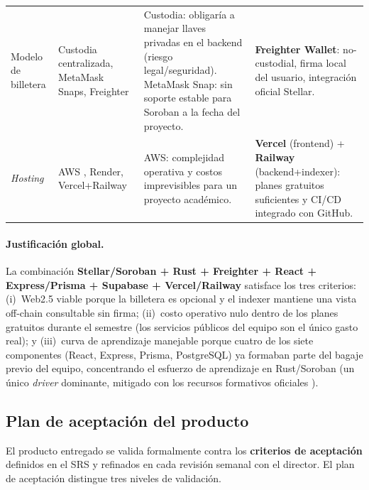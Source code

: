 \documentclass[12pt,oneside]{report}
\begin{document}
\begin{longtable}{@{}p{2.8cm} p{3.4cm} p{4.2cm} p{4.0cm}@{}}
        Modelo de billetera & Custodia centralizada, MetaMask Snaps, Freighter \cite{freighter} & Custodia: obligaría a manejar llaves privadas en el backend (riesgo legal/seguridad). MetaMask Snap: sin soporte estable para Soroban a la fecha del proyecto. & \textbf{Freighter Wallet}: no-custodial, firma local del usuario, integración oficial Stellar.\\
        \textit{Hosting} & AWS \cite{awsdocs}, Render, Vercel+Railway \cite{verceldocs,railwaydocs} & AWS: complejidad operativa y costos imprevisibles para un proyecto académico. & \textbf{Vercel} (frontend) + \textbf{Railway} (backend+indexer): planes gratuitos suficientes y CI/CD integrado con GitHub.\\
      \end{longtable}

      \paragraph{Justificación global.} La combinación \textbf{Stellar/Soroban + Rust + Freighter + React + Express/Prisma + Supabase + Vercel/Railway} satisface los tres criterios: (i)~Web2.5 viable porque la billetera es opcional y el indexer mantiene una vista off-chain consultable sin firma; (ii)~costo operativo nulo dentro de los planes gratuitos durante el semestre (los servicios públicos del equipo son el único gasto real); y (iii)~curva de aprendizaje manejable porque cuatro de los siete componentes (React, Express, Prisma, PostgreSQL) ya formaban parte del bagaje previo del equipo, concentrando el esfuerzo de aprendizaje en Rust/Soroban (un único \textit{driver} dominante, mitigado con los recursos formativos oficiales \cite{sorobandocs,klabnik2023}).

    \subsection{Plan de aceptación del producto}
    \label{subsec:plan-aceptacion}

      El producto entregado se valida formalmente contra los \textbf{criterios de aceptación} definidos en el SRS y refinados en cada revisión semanal con el director. El plan de aceptación distingue tres niveles de validación.
\end{document}
